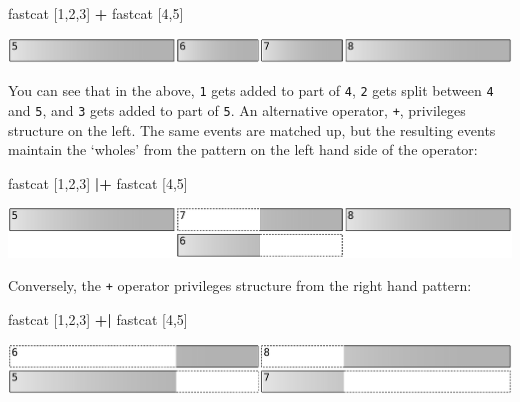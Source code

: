 \documentclass[
]{article}
\newenvironment{Shaded}{\begin{snugshade}}{\end{snugshade}}
\newcommand{\DecValTok}[1]{\textcolor[rgb]{0.00,0.00,0.81}{#1}}
\newcommand{\NormalTok}[1]{#1}
\newcommand{\OperatorTok}[1]{\textcolor[rgb]{0.81,0.36,0.00}{\textbf{#1}}}
\begin{document}
\begin{Shaded}
\begin{Highlighting}[]
\NormalTok{fastcat [}\DecValTok{1}\NormalTok{,}\DecValTok{2}\NormalTok{,}\DecValTok{3}\NormalTok{] }\OperatorTok{+}\NormalTok{ fastcat [}\DecValTok{4}\NormalTok{,}\DecValTok{5}\NormalTok{]}
\end{Highlighting}
\end{Shaded}

\includegraphics[width=1\textwidth,height=\textheight]{figures/5a95fc0670ae3bb993fa97b33c8937f8_0.pdf}

You can see that in the above, \texttt{1} gets added to part of
\texttt{4}, \texttt{2} gets split between \texttt{4} and \texttt{5}, and
\texttt{3} gets added to part of \texttt{5}. An alternative operator,
\texttt{\textbar{}+}, privileges structure on the left. The same events
are matched up, but the resulting events maintain the `wholes' from the
pattern on the left hand side of the operator:

\begin{Shaded}
\begin{Highlighting}[]
\NormalTok{fastcat [}\DecValTok{1}\NormalTok{,}\DecValTok{2}\NormalTok{,}\DecValTok{3}\NormalTok{] }\OperatorTok{|+}\NormalTok{ fastcat [}\DecValTok{4}\NormalTok{,}\DecValTok{5}\NormalTok{]}
\end{Highlighting}
\end{Shaded}

\includegraphics[width=1\textwidth,height=\textheight]{figures/df0a301c3ac358e46fab2b793f180e9f_0.pdf}

Conversely, the \texttt{+\textbar{}} operator privileges structure from
the right hand pattern:

\begin{Shaded}
\begin{Highlighting}[]
\NormalTok{fastcat [}\DecValTok{1}\NormalTok{,}\DecValTok{2}\NormalTok{,}\DecValTok{3}\NormalTok{] }\OperatorTok{+|}\NormalTok{ fastcat [}\DecValTok{4}\NormalTok{,}\DecValTok{5}\NormalTok{]}
\end{Highlighting}
\end{Shaded}

\includegraphics[width=1\textwidth,height=\textheight]{figures/97e25ab63906058b5e790f194888828d_0.pdf}
\end{document}
